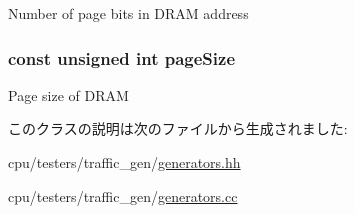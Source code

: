 \label{classDramGen_a91979f75432119c425a60258ae2fae8f}
Number of page bits in DRAM address \hypertarget{classDramGen_a0a5d2b9bad523ef4f6c613e9955c461d}{
\subsubsection[{pageSize}]{\setlength{\rightskip}{0pt plus 5cm}const unsigned int {\bf pageSize}}}
\label{classDramGen_a0a5d2b9bad523ef4f6c613e9955c461d}
Page size of DRAM 

このクラスの説明は次のファイルから生成されました:\begin{DoxyCompactItemize}
\item 
cpu/testers/traffic\_\-gen/\hyperlink{generators_8hh}{generators.hh}\item 
cpu/testers/traffic\_\-gen/\hyperlink{generators_8cc}{generators.cc}\end{DoxyCompactItemize}
